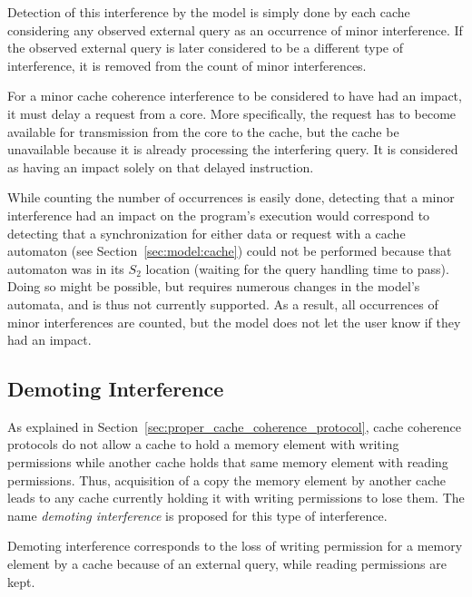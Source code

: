 Detection of this interference by the model is simply done by each cache
considering any observed external query as an occurrence of minor interference.
If the observed external query is later considered to be a different type of
interference, it is removed from the count of minor interferences.

For a minor cache coherence interference to be considered to have had an impact,
it must delay a request from a core. More specifically, the request has to
become available for transmission from the core to the cache, but the cache be
unavailable because it is already processing the interfering query. It is
considered as having an impact solely on that delayed instruction.

While counting the number of occurrences is easily done, detecting that a minor
interference had an impact on the program's execution would correspond to
detecting that a synchronization for either data or request with a cache
automaton (see Section~\ref{sec:model:cache}) could not be performed because
that automaton was in its $S_2$ location (waiting for the query handling time
to pass). Doing so might be possible, but requires numerous changes in the
model's automata, and is thus not currently supported. As a result, all
occurrences of minor interferences are counted, but the model does not let the
user know if they had an impact.

\subsection{Demoting Interference}
As explained in Section~\ref{sec:proper_cache_coherence_protocol}, cache
coherence protocols do not allow a cache to hold a memory element with writing
permissions while another cache holds that same memory element with reading
permissions. Thus, acquisition of a copy the memory element by another cache
leads to any cache currently holding it with writing permissions to lose them.
The name \textit{demoting interference} is proposed for this type of
interference.

\begin{definition}
Demoting interference corresponds to the loss of writing permission for a memory
element by a cache because of an external query, while reading permissions are
kept.
\end{definition}



